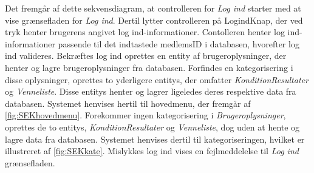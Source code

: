 Det fremgår af dette sekvensdiagram, at controlleren for \textit{Log ind} starter med at vise grænsefladen for \textit{Log ind}. Dertil lytter controlleren på LogindKnap, der ved tryk henter brugerens angivet log ind-informationer. Contolleren henter log ind-informationer passende til det indtastede medlemsID i databasen, hvorefter log ind valideres. Bekræftes log ind oprettes en entity af brugeroplysninger, der henter og lagre brugeroplysninger fra databasen. Forfindes en kategorisering i disse oplysninger, oprettes to yderligere entitys, der omfatter \textit{KonditionResultater} og \textit{Venneliste}. Disse entitys henter og lagrer ligeledes deres respektive data fra databasen. Systemet henvises hertil til hovedmenu, der fremgår af \autoref{fig:SEKhovedmenu}.
Forekommer ingen kategorisering i \textit{Brugeroplysninger}, oprettes de to entitys, \textit{KonditionResultater} og \textit{Venneliste}, dog uden at hente og lagre data fra databasen. Systemet henvises dertil til kategoriseringen, hvilket er illustreret af \autoref{fig:SEKkate}.
Mislykkes log ind vises en fejlmeddelelse til \textit{Log ind} grænsefladen. 
